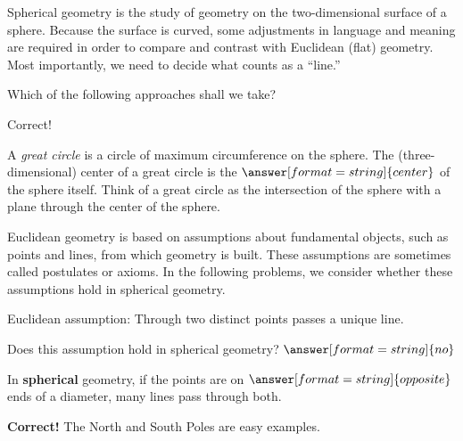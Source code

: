 \documentclass{ximera}
\begin{document}
\begin{problem}
Spherical geometry is the study of geometry on the two-dimensional surface of a sphere.  Because the surface is curved, some adjustments in language and meaning are required in order to compare and contrast with Euclidean (flat) geometry.  Most importantly, we need to decide what counts as a ``line.''

Which of the following approaches shall we take?  

\begin{multipleChoice}
\end{multipleChoice}
\begin{problem}
Correct! 

A \emph{great circle} is a circle of maximum circumference on the sphere.  The (three-dimensional) center of a great circle is the $\answer[format=string]{center}$ of the sphere itself.  Think of a great circle as the intersection of the sphere with a plane through the center of the sphere.  

\end{problem}

\end{problem}

Euclidean geometry is based on assumptions about fundamental objects, such as points and lines, from which geometry is built. These assumptions are sometimes called postulates or axioms. In the following problems, we consider whether these assumptions hold in spherical geometry. 


\begin{problem} %
Euclidean assumption: Through two distinct points passes a unique line.  

Does this assumption hold in spherical geometry? 
$\answer[format=string]{no}$

\begin{problem}

In \textbf{spherical} geometry, if the points are on $\answer[format=string]{opposite}$ ends of a diameter, many lines pass through both.
\begin{feedback}[correct]
\textbf{Correct!} The North and South Poles are easy examples.  
\end{feedback}
\end{problem}
\end{problem}
\end{document}

